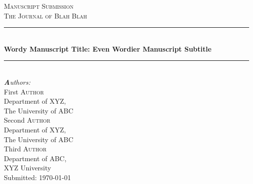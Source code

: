 
\begin{titlepage}

  \newcommand{\HRule}{\rule{\linewidth}{0.5mm}} %

  \center %



  \textsc{\Large Manuscript Submission}\\[0.5cm] %
  \textsc{\large The Journal of Blah Blah}\\[0.5cm] %


  \vspace{1.5 cm}
  \HRule \\[0.4cm]
  { \huge \bfseries Wordy Manuscript Title: Even Wordier Manuscript Subtitle}\\[0.4cm] %
  \HRule \\[1.5cm]
 

  {\em\Large\textbf Authors:}\\
  \vspace{.5 cm}
  First \textsc{Author}\\
  Department of XYZ,\\
  The University of ABC\\
  \vspace{.5 cm}
  Second \textsc{Author}\\
  Department of XYZ,\\
  The University of ABC\\
  \vspace{.5 cm}
  Third \textsc{Author}\\
  Department of ABC,\\
  XYZ University\\


  \vspace{1.5 cm}
  {\large Submitted: \today}\\[3cm] %


\vfill %

\end{titlepage}


\newpage
